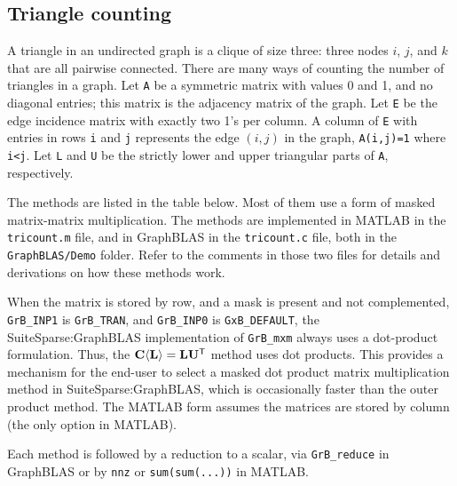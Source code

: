 \documentclass[12pt]{article}
\begin{document}
\subsection{Triangle counting}
\label{triangle}

A triangle in an undirected graph is a clique of size three:  three nodes $i$,
$j$, and $k$ that are all pairwise connected.  There are many ways of counting
the number of triangles in a graph.  Let \verb'A' be a symmetric matrix with
values 0 and 1, and no diagonal entries; this matrix is the adjacency matrix of
the graph.  Let \verb'E' be the edge incidence matrix with exactly two 1's per
column.  A column of \verb'E' with entries in rows \verb'i' and \verb'j'
represents the edge $(i,j)$ in the graph, \verb'A(i,j)=1' where \verb'i<j'.
Let \verb'L' and \verb'U' be the strictly lower and upper triangular parts of
\verb'A', respectively.

The methods are listed in the table below.  Most of them use a form of masked
matrix-matrix multiplication.  The methods are implemented in MATLAB in the
\verb'tricount.m' file, and in GraphBLAS in the \verb'tricount.c' file, both in
the \verb'GraphBLAS/Demo' folder.  Refer to the comments in those two files for
details and derivations on how these methods work.

When the matrix is stored by row, and a mask is present and not complemented,
\verb'GrB_INP1' is \verb'GrB_TRAN', and \verb'GrB_INP0' is \verb'GxB_DEFAULT',
the SuiteSparse:GraphBLAS implementation of \verb'GrB_mxm' always uses a
dot-product formulation.  Thus, the ${\bf C \langle L \rangle} = {\bf L}{\bf
U}^{\sf T}$ method uses dot products.  This provides a mechanism for the
end-user to select a masked dot product matrix multiplication method in
SuiteSparse:GraphBLAS, which is occasionally faster than the outer product
method.  The MATLAB form assumes the matrices are stored by column
(the only option in MATLAB).

Each method is followed by a reduction to a scalar, via \verb'GrB_reduce' in
GraphBLAS or by \verb'nnz' or \verb'sum(sum(...))' in MATLAB.
\end{document}
